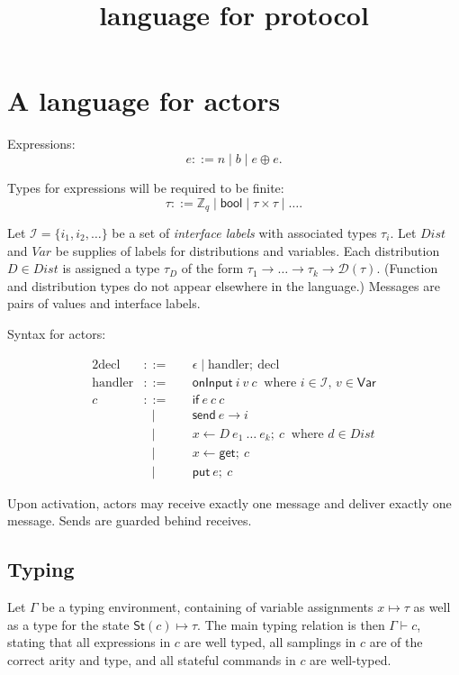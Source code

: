 \documentclass{article}
\title{language for protocol}
\begin{document}
\maketitle

\section{A language for actors}

Expressions:
\[ e ::= n \mid b \mid e \oplus e. \]

Types for expressions will be required to be finite:
\[ \tau ::= \mathbb{Z}_{q} \mid \textsf{bool} \mid \tau \times \tau \mid \dots. \]

Let $\mathcal{I} = \{i_1, i_2, \dots \}$ be a set of \emph{interface labels} with associated types $\tau_i$. Let $\textit{Dist}$ and $\textit{Var}$ be supplies of labels for distributions and variables. Each distribution $D \in \textit{Dist}$ is assigned a type $\tau_D$ of the form $\tau_1 \to \dots \to \tau_k \to \mathcal{D}(\tau)$. (Function and distribution types do not appear elsewhere in the language.) Messages are pairs of values and interface labels.


Syntax for actors:

\begin{alignat*}{2}
    \text{decl} &::=\ && \epsilon \mid \text{handler};\ \text{decl} \\
    \text{handler} &::=\ &&\textsf{onInput}\ i\ v\ c\ \text{ where $i \in \mathcal{I}$, $v \in \textsf{Var}$} \\
    c &::=\ &&\textsf{if}\ e\ c\ c \\
    &\ \ \ \mid &&\textsf{send}\ e \to i \\
    &\ \ \ \mid &&x \leftarrow D\ e_1\ \dots\ e_k;\ c\ \text{   where $d \in \textit{Dist}$} \\
    &\ \ \ \mid &&x \leftarrow \textsf{get};\ c \\
    &\ \ \ \mid &&\textsf{put}\ e;\ c
\end{alignat*}

Upon activation, actors may receive exactly one message and deliver exactly one message. Sends are guarded behind receives.

\subsection{Typing}
Let $\Gamma$ be a typing environment, containing of variable assignments $x \mapsto \tau$ as well as a type for the state $\textsf{St}(c) \mapsto \tau$. The main typing relation is then $\Gamma \vdash c$, stating that all expressions in $c$ are well typed, all samplings in $c$ are of the correct arity and type, and all stateful commands in $c$ are well-typed.
\end{document}
